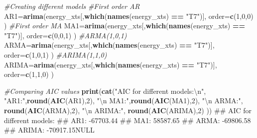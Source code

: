 \documentclass[]{article}
\newenvironment{Shaded}{\begin{snugshade}}{\end{snugshade}}
\newcommand{\KeywordTok}[1]{\textcolor[rgb]{0.13,0.29,0.53}{\textbf{#1}}}
\newcommand{\DataTypeTok}[1]{\textcolor[rgb]{0.13,0.29,0.53}{#1}}
\newcommand{\DecValTok}[1]{\textcolor[rgb]{0.00,0.00,0.81}{#1}}
\newcommand{\CharTok}[1]{\textcolor[rgb]{0.31,0.60,0.02}{#1}}
\newcommand{\StringTok}[1]{\textcolor[rgb]{0.31,0.60,0.02}{#1}}
\newcommand{\CommentTok}[1]{\textcolor[rgb]{0.56,0.35,0.01}{\textit{#1}}}
\newcommand{\OperatorTok}[1]{\textcolor[rgb]{0.81,0.36,0.00}{\textbf{#1}}}
\newcommand{\NormalTok}[1]{#1}
\begin{document}
\begin{Shaded}
\begin{Highlighting}[]
\CommentTok{#Creating different models}
\CommentTok{#First order AR}
\NormalTok{AR1=}\KeywordTok{arima}\NormalTok{(energy_xts[,}\KeywordTok{which}\NormalTok{(}\KeywordTok{names}\NormalTok{(energy_xts) }\OperatorTok{==}\StringTok{ "T7"}\NormalTok{)], }\DataTypeTok{order=}\KeywordTok{c}\NormalTok{(}\DecValTok{1}\NormalTok{,}\DecValTok{0}\NormalTok{,}\DecValTok{0}\NormalTok{) )}
\CommentTok{#First order MA}
\NormalTok{MA1=}\KeywordTok{arima}\NormalTok{(energy_xts[,}\KeywordTok{which}\NormalTok{(}\KeywordTok{names}\NormalTok{(energy_xts) }\OperatorTok{==}\StringTok{ "T7"}\NormalTok{)], }\DataTypeTok{order=}\KeywordTok{c}\NormalTok{(}\DecValTok{0}\NormalTok{,}\DecValTok{0}\NormalTok{,}\DecValTok{1}\NormalTok{) )}
\CommentTok{#ARMA(1,0,1)}
\NormalTok{ARMA=}\KeywordTok{arima}\NormalTok{(energy_xts[,}\KeywordTok{which}\NormalTok{(}\KeywordTok{names}\NormalTok{(energy_xts) }\OperatorTok{==}\StringTok{ "T7"}\NormalTok{)], }\DataTypeTok{order=}\KeywordTok{c}\NormalTok{(}\DecValTok{1}\NormalTok{,}\DecValTok{0}\NormalTok{,}\DecValTok{1}\NormalTok{) )}
\CommentTok{#ARIMA(1,1,0)}
\NormalTok{ARIMA=}\KeywordTok{arima}\NormalTok{(energy_xts[,}\KeywordTok{which}\NormalTok{(}\KeywordTok{names}\NormalTok{(energy_xts) }\OperatorTok{==}\StringTok{ "T7"}\NormalTok{)], }\DataTypeTok{order=}\KeywordTok{c}\NormalTok{(}\DecValTok{1}\NormalTok{,}\DecValTok{1}\NormalTok{,}\DecValTok{0}\NormalTok{) )}

\CommentTok{#Comparing AIC values}
\KeywordTok{print}\NormalTok{(}\KeywordTok{cat}\NormalTok{(}\StringTok{"AIC for different models:}\CharTok{\textbackslash{}n}\StringTok{"}\NormalTok{, }\StringTok{"AR1:"}\NormalTok{,}\KeywordTok{round}\NormalTok{(}\KeywordTok{AIC}\NormalTok{(AR1),}\DecValTok{2}\NormalTok{), }\StringTok{"}\CharTok{\textbackslash{}n}\StringTok{ MA1:"}\NormalTok{,}\KeywordTok{round}\NormalTok{(}\KeywordTok{AIC}\NormalTok{(MA1),}\DecValTok{2}\NormalTok{), }
            \StringTok{"}\CharTok{\textbackslash{}n}\StringTok{ ARMA:"}\NormalTok{, }\KeywordTok{round}\NormalTok{(}\KeywordTok{AIC}\NormalTok{(ARMA),}\DecValTok{2}\NormalTok{), }\StringTok{"}\CharTok{\textbackslash{}n}\StringTok{ ARIMA:"}\NormalTok{, }\KeywordTok{round}\NormalTok{(}\KeywordTok{AIC}\NormalTok{(ARIMA),}\DecValTok{2}\NormalTok{) ))}
\NormalTok{## AIC for different models:}
\NormalTok{##  AR1: -67703.44 }
\NormalTok{##  MA1: 58587.65 }
\NormalTok{##  ARMA: -69806.58 }
\NormalTok{##  ARIMA: -70917.15NULL}
\end{Highlighting}
\end{Shaded}
\end{document}
